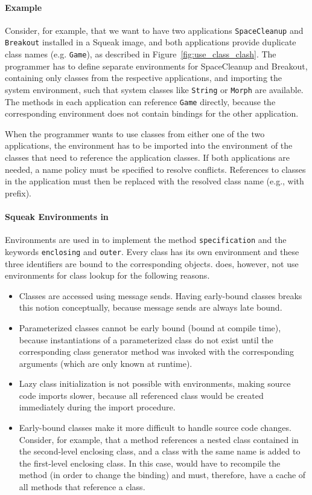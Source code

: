\paragraph{Example}
Consider, for example, that we want to have two applications \texttt{SpaceCleanup} and \texttt{Breakout} installed in a Squeak image, and both applications provide duplicate class names (e.g. \texttt{Game}), as described in Figure~\ref{fig:use_class_clash}. The programmer has to define separate environments for SpaceCleanup and Breakout, containing only classes from the respective applications, and importing the system environment, such that system classes like \texttt{String} or \texttt{Morph} are available. The methods in each application can reference \texttt{Game} directly, because the corresponding environment does not contain bindings for the other application.

When the programmer wants to use classes from either one of the two applications, the environment has to be imported into the environment of the classes that need to reference the application classes. If both applications are needed, a name policy must be specified to resolve conflicts. References to classes in the application must then be replaced with the resolved class name (e.g., with prefix).

\paragraph{Squeak Environments in \msname}
Environments are used in \msname to implement the method \texttt{specification} and the keywords \texttt{enclosing} and \texttt{outer}. Every class has its own environment and these three identifiers are bound to the corresponding objects. \msname does, however, not use environments for class lookup for the following reasons.

\begin{itemize}
    \item Classes are accessed using message sends. Having early-bound classes breaks this notion conceptually, because message sends are always late bound.
    \item Parameterized classes cannot be early bound (bound at compile time), because instantiations of a parameterized class do not exist until the corresponding class generator method was invoked with the corresponding arguments (which are only known at runtime).
    \item Lazy class initialization is not possible with environments, making source code imports slower, because all referenced class would be created immediately during the import procedure.
    \item Early-bound classes make it more difficult to handle source code changes. Consider, for example, that a method references a nested class contained in the second-level enclosing class, and a class with the same name is added to the first-level enclosing class. In this case, \msname would have to recompile the method (in order to change the binding) and must, therefore, have a cache of all methods that reference a class.
\end{itemize}

